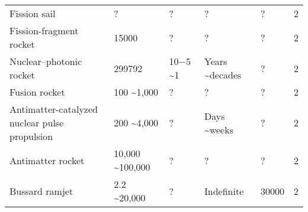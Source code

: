 \begin{landscape}
\begin{longtable}{lllllr}
                                      Fission sail &                                    ? &                ? &                       ? &                      ? &    2 \\
                           Fission-fragment rocket &                                15000 &                ? &                       ? &                      ? &    2 \\
                           Nuclear–photonic rocket &                               299792 &         10−5 \textasciitilde 1 &         Years \textasciitilde decades &                      ? &    2 \\
                                     Fusion rocket &                          100 \textasciitilde 1,000 &                ? &                       ? &                      ? &    2 \\
     Antimatter-catalyzed nuclear pulse propulsion &                          200 \textasciitilde 4,000 &                ? &            Days \textasciitilde weeks &                      ? &    2 \\
                                 Antimatter rocket &                     10,000 \textasciitilde 100,000 &                ? &                       ? &                      ? &    2 \\
                                    Bussard ramjet &                         2.2 \textasciitilde 20,000 &                ? &              Indefinite &                  30000 &    2 \\
\end{longtable}

\end{landscape}
